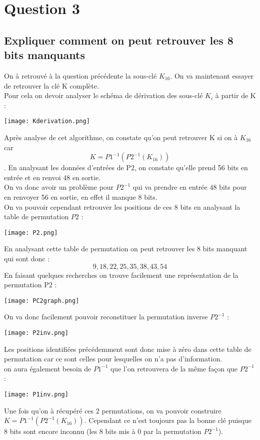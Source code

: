 \documentclass[a4paper,11pt]{article}
\begin{document}
	\section{Question 3}
	\subsection{Expliquer comment on peut retrouver les 8 bits manquants}
	On à retrouvé à la question précédente la sous-clé $K_{16}$. On va maintenant essayer de retrouver la clé K complète.\\
	Pour cela on devoir analyser le schéma de dérivation des sous-clé $K_{i}$ à partir de K :
	\begin{center}\texttt{[image: Kderivation.png]}\end{center}
	Après analyse de cet algorithme, on constate qu'on peut retrouver K si on à $K_{16}$ car 
	$$K =  P1^{-1}(P2^{-1}(K_{16}))$$.
	En analysant les données d'entrées de P2, on constate qu'elle prend 56 bits en entrée et en renvoi 48 en sortie.\\
	On va donc avoir un problème pour $P2^{-1}$ qui va prendre en entrée 48 bits pour en renvoyer 56 en sortie, en effet il manque 8 bits.\\
	On va pouvoir cependant retrouver les positions de ces 8 bits en analysant la table de permutation $P2$ : 
	\begin{center}\texttt{[image: P2.png]}\end{center}
	En analysant cette table de permutation on peut retrouver les 8 bits manquant qui sont donc : 
	$$ 9, 18, 22, 25, 35, 38, 43, 54$$
	En faisant quelques recherches on trouve facilement une représentation de la permutation P2 :
	\begin{center}\texttt{[image: PC2graph.png]}\end{center}
	On va donc facilement pouvoir reconstituer la permutation inverse $P2^{-1}$ :
	\begin{center}\texttt{[image: P2inv.png]}\end{center}
	Les positions identifiées précédemment sont donc mise à zéro dans cette table de permutation car ce sont celles pour lesquelles on n'a pas d'information.\\ 
	on aura également besoin de $P1^{-1}$ que l'on retrouvera de la même façon que $P2^{-1}$ : 
	\begin{center}\texttt{[image: P1inv.png]}\end{center}
	Une fois qu'on à récupéré ces 2 permutations, on va pouvoir construire $K = P1^{-1}(P2^{-1}(K_{16}))$. Cependant ce n'est toujours pas la bonne clé puisque 8 bits sont encore inconnu (les 8 bits mis à 0 par la permutation  $P2^{-1}$). \\
\end{document}
